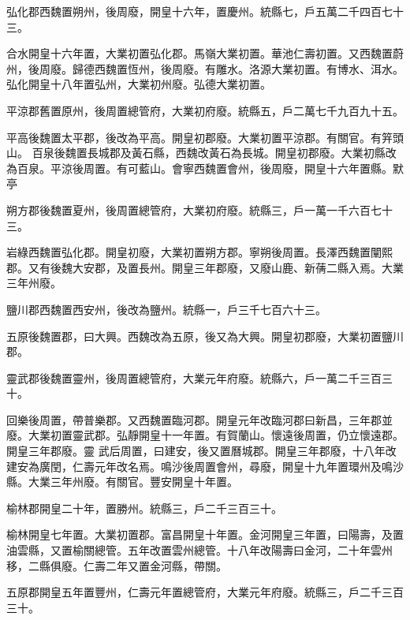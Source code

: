 \begin{pinyinscope}
 弘化郡西魏置朔州，後周廢，開皇十六年，置慶州。統縣七，戶五萬二千四百七十三。



 合水開皇十六年置，大業初置弘化郡。馬嶺大業初置。華池仁壽初置。又西魏置蔚州，後周廢。歸德西魏置恆州，後周廢。有雕水。洛源大業初置。有博水、洱水。弘化開皇十八年置弘州，大業初州廢。弘德大業初置。



 平涼郡舊置原州，後周置總管府，大業初府廢。統縣五，戶二萬七千九百九十五。



 平高後魏置太平郡，後改為平高。開皇初郡廢。大業初置平涼郡。有關官。有笄頭山。
 百泉後魏置長城郡及黃石縣，西魏改黃石為長城。開皇初郡廢。大業初縣改為百泉。平涼後周置。有可藍山。會寧西魏置會州，後周廢，開皇十六年置縣。默亭



 朔方郡後魏置夏州，後周置總管府，大業初府廢。統縣三，戶一萬一千六百七十三。



 岩綠西魏置弘化郡。開皇初廢，大業初置朔方郡。寧朔後周置。長澤西魏置闡熙郡。又有後魏大安郡，及置長州。開皇三年郡廢，又廢山鹿、新蒨二縣入焉。大業三年州廢。



 鹽川郡西魏置西安州，後改為鹽州。統縣一，戶三千七百六十三。



 五原後魏置郡，曰大興。西魏改為五原，後又為大興。開皇初郡廢，大業初置鹽川郡。



 靈武郡後魏置靈州，後周置總管府，大業元年府廢。統縣六，戶一萬二千三百三十。



 回樂後周置，帶普樂郡。又西魏置臨河郡。開皇元年改臨河郡曰新昌，三年郡並廢。大業初置靈武郡。弘靜開皇十一年置。有賀蘭山。懷遠後周置，仍立懷遠郡。開皇三年郡廢。靈
 武后周置，曰建安，後又置曆城郡。開皇三年郡廢，十八年改建安為廣閏，仁壽元年改名焉。鳴沙後周置會州，尋廢，開皇十九年置環州及鳴沙縣。大業三年州廢。有關官。豐安開皇十年置。



 榆林郡開皇二十年，置勝州。統縣三，戶二千三百三十。



 榆林開皇七年置。大業初置郡。富昌開皇十年置。金河開皇三年置，曰陽壽，及置油雲縣，又置榆關總管。五年改置雲州總管。十八年改陽壽曰金河，二十年雲州移，二縣俱廢。仁壽二年又置金河縣，帶關。



 五原郡開皇五年置豐州，仁壽元年置總管府，大業元年府廢。統縣三，戶二千三百三十。




\end{pinyinscope}
